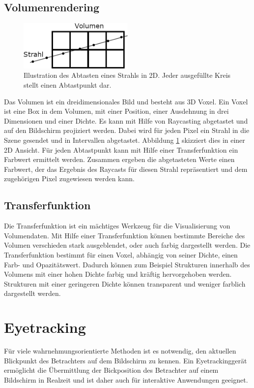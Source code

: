 \subsection{Volumenrendering}
\begin{figure}
	\centering
	\includegraphics[width=0.5\textwidth]{../../Grafiken/Abtasten_eines_Strahls.png}
	\caption{Illustration des Abtasten eines Strahls in 2D. Jeder ausgefüllte Kreis stellt einen Abtastpunkt dar.}
	\label{fig::rc04}
\end{figure}
Das Volumen ist ein dreidimensionales Bild und besteht aus 3D Voxel.
Ein Voxel ist eine Box in dem Volumen, mit einer Position, einer Ausdehnung in drei Dimensionen und einer Dichte.
Es kann mit Hilfe von Raycasting abgetastet und auf den Bildschirm projiziert werden.
Dabei wird für jeden Pixel ein Strahl in die Szene gesendet und in Intervallen abgetastet.
Abbildung \ref{fig::rc04} skizziert dies in einer 2D Ansicht.
Für jeden Abtastpunkt kann mit Hilfe einer Transferfunktion ein Farbwert ermittelt werden.
Zusammen ergeben die abgetasteten Werte einen Farbwert, der das Ergebnis des Raycasts für diesen Strahl repräsentiert und dem zugehörigen Pixel zugewiesen werden kann.

\subsection{Transferfunktion}
Die Transferfunktion ist ein mächtiges Werkzeug für die Visualisierung von Volumendaten.
Mit Hilfe einer Transferfunktion können bestimmte Bereiche des Volumen verschieden stark ausgeblendet, oder auch farbig dargestellt werden.
Die Transferfunktion bestimmt für einen Voxel, abhängig von seiner Dichte, einen Farb- und Opazitätswert.
Dadurch können zum Beispiel Strukturen innerhalb des Volumens mit einer hohen Dichte farbig und kräftig hervorgehoben werden.
Strukturen mit einer geringeren Dichte können transparent und weniger farblich dargestellt werden.

\section{Eyetracking}\label{sec::eyetr}
Für viele wahrnehmungsorientierte Methoden ist es notwendig, den aktuellen Blickpunkt des Betrachters auf dem Bildschirm zu kennen.
Ein Eyetrackinggerät ermöglicht die Übermittlung der Bickposition des Betrachter auf einem Bildschirm in Realzeit und ist daher auch für interaktive Anwendungen geeignet.

